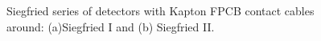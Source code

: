 \begin{figure}[tbhp]
\centering
{}\hfil %
%
\caption{Siegfried series of detectors with Kapton FPCB contact cables around: (a)Siegfried I and (b) Siegfried II.}
\label{fig:ger:sies}
\end{figure}

